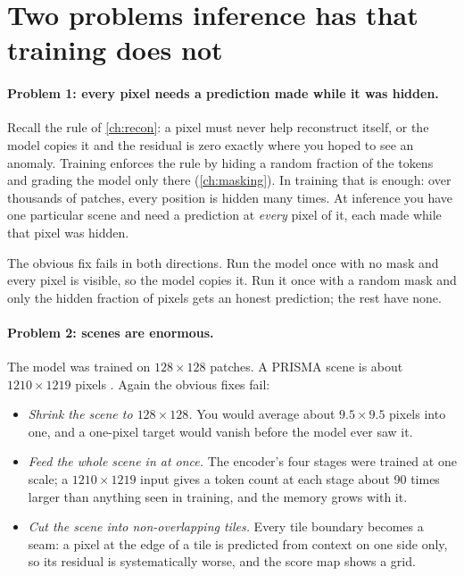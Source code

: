 \section{Two problems inference has that training does not}\label{sec:inference:problems}

\paragraph{Problem 1: every pixel needs a prediction made while it was hidden.}
Recall the rule of \cref{ch:recon}: a pixel must never help reconstruct itself, or the model copies it and
the residual is zero exactly where you hoped to see an anomaly. Training enforces the rule by hiding a random
fraction of the tokens and grading the model only there (\cref{ch:masking}). In training that is enough:
over thousands of patches, every position is hidden many times. At inference you have one particular scene
and need a prediction at \emph{every} pixel of it, each made while that pixel was hidden.

The obvious fix fails in both directions. Run the model once with no mask and every pixel is visible, so
the model copies it. Run it once with a random mask and only the hidden fraction of pixels gets an honest
prediction; the rest have none.

\paragraph{Problem 2: scenes are enormous.}
The model was trained on $128\times128$ patches. A PRISMA scene is about $1210\times1219$
pixels . Again the obvious fixes fail:
\begin{itemize}
\item \emph{Shrink the scene to $128\times128$.} You would average about $9.5\times9.5$ pixels into one, and
  a one-pixel target would vanish before the model ever saw it.
\item \emph{Feed the whole scene in at once.} The encoder's four stages were trained at one scale; a
  $1210\times1219$ input gives a token count at each stage about 90 times larger than anything seen in
  training, and the memory grows with it.
\item \emph{Cut the scene into non-overlapping tiles.} Every tile boundary becomes a seam: a pixel at the
  edge of a tile is predicted from context on one side only, so its residual is systematically worse, and
  the score map shows a grid.
\end{itemize}

